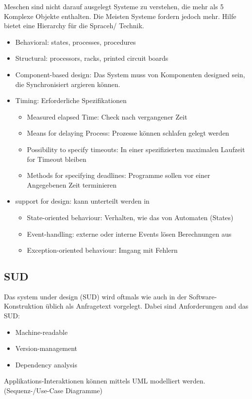 Meschen sind nicht darauf ausgelegt Systeme zu verstehen, die mehr als 5 Komplexe Objekte enthalten.
Die Meisten Systeme fordern jedoch mehr.
Hilfe bietet eine Hierarchy für die Spraceh/ Technik.
\begin{itemize}
    \item Behavioral: states, processes, procedures
    \item Structural: processors, racks, printed circuit boards
    \item Component-based design: Das System muss von Komponenten designed sein,
            die Synchronisiert argieren können.
    \item Timing: Erforderliche Spezifikationen \begin{itemize}
        \item Measured elapsed Time: Check nach vergangener Zeit
        \item Means for delaying Process: Prozesse können schlafen gelegt werden
        \item Possibility to specify timeouts: In einer spezifizierten maximalen Laufzeit for Timeout bleiben
        \item Methods for specifying deadlines: Programme sollen vor einer Angegebenen Zeit terminieren
    \end{itemize}
    \item support for design: kann unterteilt werden in \begin{itemize}
        \item State-oriented behaviour: Verhalten, wie das von Automaten (States)
        \item Event-handling: externe oder interne Events lösen Berechnungen aus
        \item Exception-oriented behaviour: Imgang mit Fehlern
    \end{itemize}
\end{itemize}



\subsection{SUD}

Das system under design (SUD) wird oftmals wie auch in der Software-Konstruktion üblich als Anfragetext
vorgelegt.
Dabei sind Anforderungen and das SUD:
\begin{itemize}
    \item Machine-readable
    \item Version-management
    \item Dependency analysis
\end{itemize}
Applikations-Interaktionen können mittels UML modelliert werden. (Sequenz-/Use-Case Diagramme)


